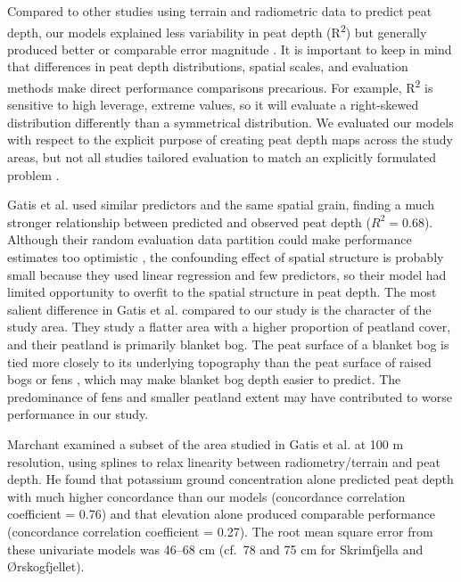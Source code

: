 \documentclass[soil, manuscript]{copernicus}
\begin{document}
Compared to other studies using terrain and radiometric data to predict peat depth, our models explained less variability in peat depth (R\textsuperscript{2}) but generally produced better or comparable error magnitude \citep[mean absolute error or root mean square error,][]{wadouxIntegratedApproachEvaluation2022}.
It is important to keep in mind that differences in peat depth distributions, spatial scales, and evaluation methods make direct performance comparisons precarious.
For example, R\textsuperscript{2} is sensitive to high leverage, extreme values, so it will evaluate a right-skewed distribution differently than a symmetrical distribution.
We evaluated our models with respect to the explicit purpose of creating peat depth maps across the study areas, but not all studies tailored evaluation to match an explicitly formulated problem \citep{milaNearestNeighbourDistance2022}.

Gatis et al. \citeyearpar{gatisMappingUplandPeat2019} used similar predictors and the same spatial grain, finding a much stronger relationship between predicted and observed peat depth (\(R^2 = 0.68\)).
Although their random evaluation data partition could make performance estimates too optimistic \citep{robertsCrossvalidationStrategiesData2017, wadouxSpatialCrossvalidationNot2021}, the confounding effect of spatial structure is probably small because they used linear regression and few predictors, so their model had limited opportunity to overfit to the spatial structure in peat depth.
The most salient difference in Gatis et al. \citeyearpar{gatisMappingUplandPeat2019} compared to our study is the character of the study area.
They study a flatter area with a higher proportion of peatland cover, and their peatland is primarily blanket bog.
The peat surface of a blanket bog is tied more closely to its underlying topography than the peat surface of raised bogs or fens \citep{lindsayPeatlandMireTypes2016}, which may make blanket bog depth easier to predict.
The predominance of fens and smaller peatland extent may have contributed to worse performance in our study.

Marchant \citeyearpar{marchantUsingRemoteSensors2021} examined a subset of the area studied in Gatis et al. \citeyearpar{gatisMappingUplandPeat2019} at 100 m resolution, using splines to relax linearity between radiometry/terrain and peat depth.
He found that potassium ground concentration alone predicted peat depth with much higher concordance than our models (concordance correlation coefficient = 0.76) and that elevation alone produced comparable performance (concordance correlation coefficient = 0.27).
The root mean square error from these univariate models was 46--68 cm (cf.~78 and 75 cm for Skrimfjella and Ørskogfjellet).
\end{document}
